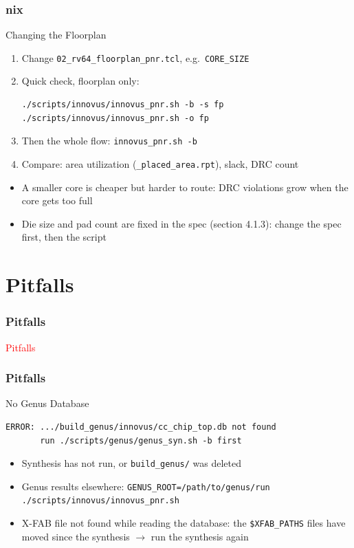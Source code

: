 \documentclass{beamer}
\newcommand{\astitle}{nix}
\newcommand{\assubtitle}{nix}
\newcommand{\cmd}[1]{\texttt{#1}}
\begin{document}
\renewcommand{\assubtitle}{Changing the Floorplan}
\begin{frame}[fragile]
\frametitle{\astitle}
\begin{block}{\assubtitle}
  \footnotesize
  \begin{enumerate}
    \item Change \cmd{02\_rv64\_floorplan\_pnr.tcl}, e.g.\ \cmd{CORE\_SIZE}
    \item Quick check, floorplan only:
\begin{lstlisting}[style=sh]
./scripts/innovus/innovus_pnr.sh -b -s fp
./scripts/innovus/innovus_pnr.sh -o fp
\end{lstlisting}
    \item Then the whole flow: \cmd{innovus\_pnr.sh -b}
    \item Compare: area utilization (\cmd{\_placed\_area.rpt}), slack,
      DRC count
  \end{enumerate}
  \vspace{4pt}
  \begin{itemize}
    \item A smaller core is cheaper but harder to route: DRC violations
      grow when the core gets too full
    \item Die size and pad count are fixed in the spec (section 4.1.3):
      change the spec first, then the script
  \end{itemize}
\end{block}
\end{frame}

\section{Pitfalls}
\renewcommand{\astitle}{Pitfalls}
\begin{frame}
\frametitle{\astitle}
\textcolor{red}{Pitfalls}
\end{frame}

\renewcommand{\assubtitle}{No Genus Database}
\begin{frame}[fragile]
\frametitle{\astitle}
\begin{block}{\assubtitle}
\begin{lstlisting}
ERROR: .../build_genus/innovus/cc_chip_top.db not found
       run ./scripts/genus/genus_syn.sh -b first
\end{lstlisting}
  \begin{itemize}
    \item Synthesis has not run, or \cmd{build\_genus/} was deleted
    \item Genus results elsewhere: \cmd{GENUS\_ROOT=/path/to/genus/run ./scripts/innovus/innovus\_pnr.sh}
    \item X-FAB file not found while reading the database: the
      \cmd{\$XFAB\_PATHS} files have moved since the synthesis
      $\rightarrow$ run the synthesis again
  \end{itemize}
\end{block}
\end{frame}
\end{document}
